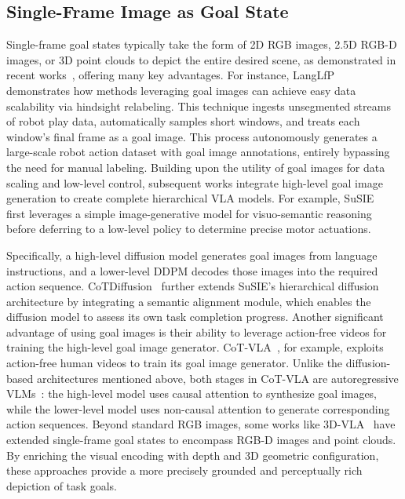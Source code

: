 \documentclass[10pt, a4paper, logo, copyright]{googledeepmind} %
\begin{document}
\subsection{Single-Frame Image as Goal State}
Single-frame goal states typically take the form of 2D RGB images, 2.5D RGB-D images, or 3D point clouds to depict the entire desired scene, as demonstrated in recent works~\cite{zhao2025cotvlavisualchainofthoughtreasoning, Ni_2024_CVPR, zhen20243d, black2023zeroshotroboticmanipulationpretrained}, offering many key advantages. 
For instance, LangLfP~\cite{LangLfP} demonstrates how methods leveraging goal images can achieve easy data scalability via hindsight relabeling. This technique ingests unsegmented streams of robot play data, automatically samples short windows, and treats each window’s final frame as a goal image. This process autonomously generates a large-scale robot action dataset with goal image annotations, entirely bypassing the need for manual labeling. 
Building upon the utility of goal images for data scaling and low-level control, subsequent works integrate high-level goal image generation to create complete hierarchical VLA models. For example, SuSIE~\cite{black2023zeroshotroboticmanipulationpretrained} first leverages a simple image-generative model for visuo-semantic reasoning before deferring to a low-level policy to determine precise motor actuations.

Specifically, a high-level diffusion model generates goal images from language instructions, and a lower-level DDPM decodes those images into the required action sequence. CoTDiffusion~\cite{Ni_2024_CVPR} further extends SuSIE's hierarchical diffusion architecture by integrating a semantic alignment module, which enables the diffusion model to assess its own task completion progress. 
Another significant advantage of using goal images is their ability to leverage action-free videos for training the high-level goal image generator. CoT-VLA~\cite{zhao2025cotvlavisualchainofthoughtreasoning}, for example, exploits action-free human videos to train its goal image generator. Unlike the diffusion-based architectures mentioned above, both stages in CoT-VLA are autoregressive VLMs~\cite{vilau}: the high-level model uses causal attention to synthesize goal images, while the lower-level model uses non-causal attention to generate corresponding action sequences. Beyond standard RGB images, some works like 3D-VLA~\cite{zhen20243d} have extended single-frame goal states to encompass RGB-D images and point clouds. By enriching the visual encoding with depth and 3D geometric configuration, these approaches provide a more precisely grounded and perceptually rich depiction of task goals. 
\end{document}

